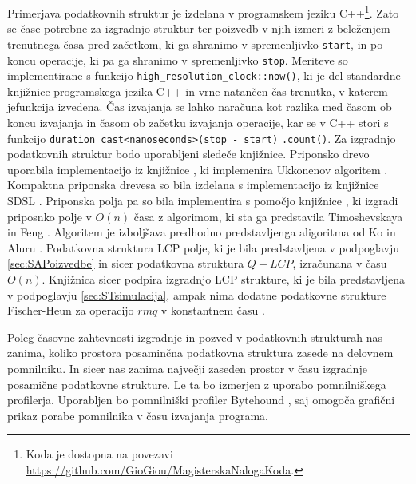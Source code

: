 Primerjava podatkovnih struktur je izdelana v programskem jeziku C++\footnote{Koda je dostopna na povezavi \url{https://github.com/GioGiou/MagisterskaNalogaKoda}.}. Zato se čase potrebne za izgradnjo struktur ter poizvedb v njih izmeri z beleženjem trenutnega časa pred začetkom, ki ga shranimo v spremenljivko \verb|start|, in po koncu operacije, ki pa ga shranimo v spremenljivko \verb|stop|. Meriteve so implementirane s funkcijo \verb|high_resolution_clock::now()|, ki je del standardne knjižnice programskega jezika C++ in vrne natančen čas trenutka, v katerem jefunkcija izvedena. Čas izvajanja se lahko naračuna kot razlika med časom ob koncu izvajanja in časom ob začetku izvajanja operacije, kar se v C++ stori s funkcijo \verb|duration_cast<nanoseconds>(stop - start)| \verb|.count()|. Za izgradnjo podatkovnih struktur bodo uporabljeni sledeče knjižnice. Priponsko drevo uporabila implementacijo iz knjižnice \cite{ganeshk13}, ki implemenira Ukkonenov algoritem \cite{Ukkonen1995}. Kompaktna priponska drevesa so bila izdelana s implementacijo iz knjižnice SDSL \cite{gbmp2014sea}. Priponska polja pa so bila implementira s pomočjo knjižnice \cite{Grebnov2025}, ki izgradi priposnko polje v $O(n)$ časa z algorimom, ki sta ga predstavila Timoshevskaya in Feng \cite{Timoshevskaya2014}. Algoritem je izboljšava predhodno predstavljenga aligoritma od Ko in Aluru \cite{Ko2005}. Podatkovna struktura LCP polje, ki je bila predstavljena v podpoglavju \ref{sec:SAPoizvedbe} in sicer podatkovna struktura $Q-LCP$, izračunana v času $O(n)$. Knjižnica \cite{Grebnov2025} sicer podpira izgradnjo LCP strukture, ki je bila predstavljena v podpoglavju \ref{sec:STsimulacija}, ampak nima dodatne podatkovne strukture Fischer-Heun za operacijo $rmq$ v konstantnem času \cite{Fischer2007}.

Poleg časovne zahtevnosti izgradnje in pozved v podatkovnih strukturah nas zanima, koliko prostora posaminčna podatkovna struktura zasede na delovnem pomnilniku. In sicer nas zanima največji zaseden prostor v času izgradnje posamične podatkovne strukture. Le ta bo izmerjen z uporabo pomnilniškega profilerja. Uporabljen bo pomnilniški profiler Bytehound \cite{Bytehound2024}, saj omogoča grafični prikaz porabe pomnilnika v času izvajanja programa.

